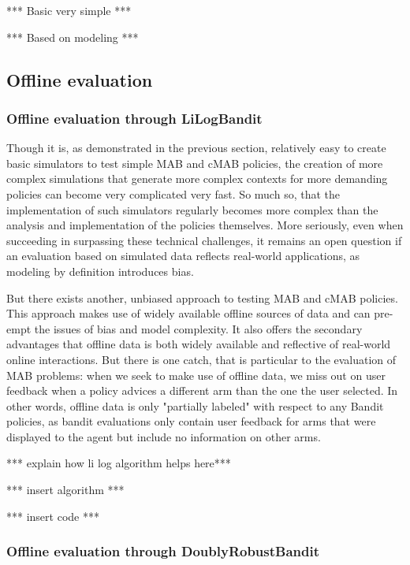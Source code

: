 \documentclass[nojss]{jss}\usepackage[]{graphicx}\usepackage[]{color}
\begin{document}
*** Basic very simple ***

*** Based on modeling ***

\subsection{Offline evaluation}

\subsubsection{Offline evaluation through LiLogBandit}

Though it is, as demonstrated in the previous section, relatively easy to create basic simulators to test simple MAB and cMAB policies, the creation of more complex simulations that generate more complex contexts for more demanding policies can become very complicated very fast. So much so, that the implementation of such simulators regularly becomes more complex than the analysis and implementation of the policies themselves. More seriously, even when succeeding in surpassing these technical challenges, it remains an open question if an evaluation based on simulated data reflects real-world applications, as modeling by definition introduces bias.

But there exists another, unbiased approach to testing MAB and cMAB policies. This approach makes use of widely available offline sources of data and can pre-empt the issues of bias and model complexity. It also offers the secondary advantages that offline data is both widely available and reflective of real-world online interactions. But there is one catch, that is particular to the evaluation of MAB problems: when we seek to make use of offline data, we miss out on user feedback when a policy advices a different arm than the one the user selected. In other words, offline data is only "partially labeled" with respect to any Bandit policies, as bandit evaluations only contain user feedback for arms that were displayed to the agent but include no information on other arms.

*** explain how li log algorithm helps here***

*** insert algorithm ***


*** insert code ***


\subsubsection{Offline evaluation through DoublyRobustBandit}
\end{document}
